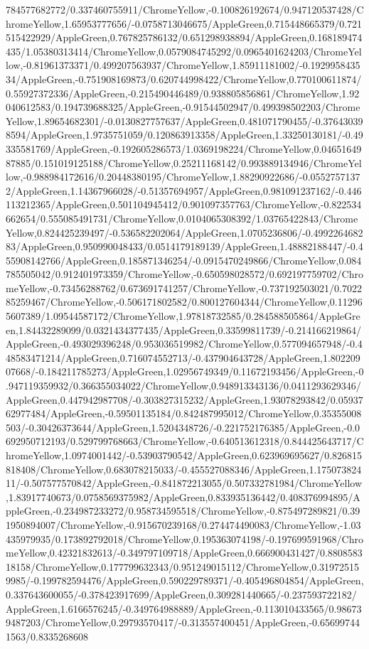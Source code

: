 {\begin{tikzternal}
784577682772/0.337460755911/ChromeYellow,-0.100826192674/0.947120537428/ChromeYellow,1.65953777656/-0.0758713046675/AppleGreen,0.715448665379/0.721515422929/AppleGreen,0.767825786132/0.651298938894/AppleGreen,0.168189474435/1.05380313414/ChromeYellow,0.0579084745292/0.0965401624203/ChromeYellow,-0.81961373371/0.499207563937/ChromeYellow,1.85911181002/-0.192995843534/AppleGreen,-0.751908169873/0.620744998422/ChromeYellow,0.770100611874/0.55927372336/AppleGreen,-0.215490446489/0.938805856861/ChromeYellow,1.92040612583/0.194739688325/AppleGreen,-0.91544502947/0.499398502203/ChromeYellow,1.89654682301/-0.0130827757637/AppleGreen,0.481071790455/-0.376430398594/AppleGreen,1.9735751059/0.120863913358/AppleGreen,1.33250130181/-0.49335581769/AppleGreen,-0.192605286573/1.0369198224/ChromeYellow,0.0465164987885/0.151019125188/ChromeYellow,0.25211168142/0.993889134946/ChromeYellow,-0.988984172616/0.20448380195/ChromeYellow,1.88290922686/-0.05527571372/AppleGreen,1.14367966028/-0.51357694957/AppleGreen,0.981091237162/-0.446113212365/AppleGreen,0.501104945412/0.901097357763/ChromeYellow,-0.822534662654/0.555085491731/ChromeYellow,0.0104065308392/1.03765422843/ChromeYellow,0.824425239497/-0.536582202064/AppleGreen,1.0705236806/-0.499226468283/AppleGreen,0.950990048433/0.0514179189139/AppleGreen,1.48882188447/-0.455908142766/AppleGreen,0.185871346254/-0.0915470249866/ChromeYellow,0.084785505042/0.912401973359/ChromeYellow,-0.650598028572/0.692197759702/ChromeYellow,-0.73456288762/0.673691741257/ChromeYellow,-0.737192503021/0.702285259467/ChromeYellow,-0.506171802582/0.800127604344/ChromeYellow,0.112965607389/1.09544587172/ChromeYellow,1.97818732585/0.284588505864/AppleGreen,1.84432289099/0.0321434377435/AppleGreen,0.33599811739/-0.214166219864/AppleGreen,-0.493029396248/0.953036519982/ChromeYellow,0.577094657948/-0.448583471214/AppleGreen,0.716074552713/-0.437904643728/AppleGreen,1.80220907668/-0.184211785273/AppleGreen,1.02956749349/0.11672193456/AppleGreen,-0.947119359932/0.366355034022/ChromeYellow,0.948913343136/0.0411293629346/AppleGreen,0.447942987708/-0.303827315232/AppleGreen,1.93078293842/0.0593762977484/AppleGreen,-0.59501135184/0.842487995012/ChromeYellow,0.35355008503/-0.30426373644/AppleGreen,1.5204348726/-0.221752176385/AppleGreen,-0.0692950712193/0.529799768663/ChromeYellow,-0.640513612318/0.844425643717/ChromeYellow,1.0974001442/-0.53903790542/AppleGreen,0.623969695627/0.826815818408/ChromeYellow,0.683078215033/-0.455527088346/AppleGreen,1.17507382411/-0.507577570842/AppleGreen,-0.841872213055/0.507332781984/ChromeYellow,1.83917740673/0.0758569375982/AppleGreen,0.833935136442/0.408376994895/AppleGreen,-0.234987233272/0.958734595518/ChromeYellow,-0.875497289821/0.391950894007/ChromeYellow,-0.915670239168/0.274474490083/ChromeYellow,-1.03435979935/0.173892792018/ChromeYellow,0.195363074198/-0.197699591968/ChromeYellow,0.42321832613/-0.349797109718/AppleGreen,0.666900431427/0.880858318158/ChromeYellow,0.177799632343/0.951249015112/ChromeYellow,0.319725159985/-0.199782594476/AppleGreen,0.590229789371/-0.405496804854/AppleGreen,0.337643600055/-0.378423917699/AppleGreen,0.309281440665/-0.237593722182/AppleGreen,1.6166576245/-0.349764988889/AppleGreen,-0.113010433565/0.986739487203/ChromeYellow,0.29793570417/-0.313557400451/AppleGreen,-0.656997441563/0.8335268608
\end{tikzternal}}
